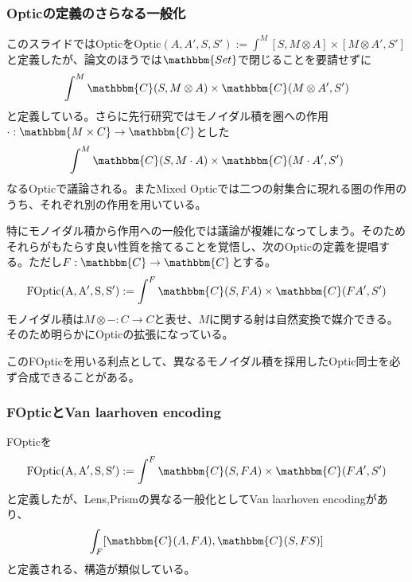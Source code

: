 \documentclass[uplatex,dvipdfmx]{beamer}
\newcommand{\cat}[1]{\mathbbm{#1}}
\newcommand{\arrow}{\rightarrow}
\newcommand{\functor}[3]{#1:\cat{#2}\arrow \cat{#3}}
\newcommand{\mor}[3]{#1:#2\arrow #3}
\newcommand{\arset}[3]{\cat{#1}(#2,#3)}
\newcommand{\inset}[2]{[#1,#2]}
\begin{document}
  \begin{frame}
    \frametitle{Opticの定義のさらなる一般化}
    このスライドではOpticを$\mathrm{Optic}(A,A',S,S'):=\int^M\inset{S}{M\otimes A}\times \inset{M\otimes A'}{S'}$と定義したが、論文のほうでは$\cat{Set}$で閉じることを要請せずに\[\int^M\arset{C}{S}{M\otimes A}\times \arset{C}{M\otimes A'}{S'}\]と定義している。さらに先行研究ではモノイダル積を圏への作用$\functor{\cdot}{M\times C}{C}$とした\[\int^M\arset{C}{S}{M\cdot A}\times \arset{C}{M\cdot  A'}{S'}\]なるOpticで議論される。またMixed Opticでは二つの射集合に現れる圏の作用のうち、それぞれ別の作用を用いている。
  \end{frame}
  \begin{frame}
    特にモノイダル積から作用への一般化では議論が複雑になってしまう。そのためそれらがもたらす良い性質を捨てることを覚悟し、次のOpticの定義を提唱する。ただし$\functor{F}{C}{C}$とする。
    \[\mathrm{FOptic(A,A',S,S')} := \int^F \arset{C}{S}{FA}\times \arset{C}{FA'}{S'}\]
    モノイダル積は$\mor{M \otimes -}{C}{C}$と表せ、$M$に関する射は自然変換で媒介できる。そのため明らかにOpticの拡張になっている。\\
    \vspace{\baselineskip}

    このFOpticを用いる利点として、異なるモノイダル積を採用したOptic同士を必ず合成できることがある。
  \end{frame}
  \begin{frame}
    \frametitle{FOpticとVan laarhoven encoding}
    FOpticを\[\mathrm{FOptic(A,A',S,S')} := \int^F \arset{C}{S}{FA}\times \arset{C}{FA'}{S'}\]と定義したが、Lens,Prismの異なる一般化としてVan laarhoven encodingがあり、\[\int_F \inset{\arset{C}{A}{FA}}{\arset{C}{S}{FS}}\]と定義される、構造が類似している。

    
  
  \end{frame}
\end{document}
